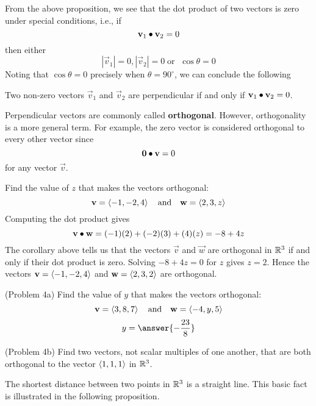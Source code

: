 \documentclass[handout]{ximera}
\begin{document}
From the above proposition, we see that the dot product of two vectors is zero under special conditions, i.e.,  if 
\[
\mathbf{v}_1 \bullet \mathbf{v}_2 = 0
\]
then either
\[
|\vec{v}_1| = 0, |\vec{v}_2| = 0 \; \text{or } \; \cos \theta = 0
\]
Noting that $\cos \theta = 0$ precisely when $\theta = 90^\circ$, we can conclude the following

\begin{corollary} 
Two non-zero vectors $\vec{v}_1$ and $\vec{v}_2$ are perpendicular if and only if $\mathbf{v}_1 \bullet \mathbf{v}_2 = 0$.
\end{corollary}

Perpendicular vectors are commonly called \textbf{orthogonal}. However, orthogonality is a more general term. 
For example, the zero vector is considered orthogonal to every other vector since
\[
\mathbf 0 \bullet \mathbf v = 0
\]
for any vector $\vec v$.

\begin{example}[Example 4]
Find the value of $z$ that makes the vectors orthogonal:
\[
\mathbf v = \left\langle -1,-2, 4\right\rangle \quad \text{and} \quad \mathbf w = \left\langle 2,3, z\right\rangle
\]
Computing the dot product gives
\[
\mathbf v \bullet \mathbf w = (-1)(2) + (-2)(3) + (4)(z) = -8+4z
\]
The corollary above tells us that the vectors $\vec v$ and $\vec w$ are orthogonal in $\mathbb R^3$ if and only if their 
dot product is zero. Solving $-8 + 4z = 0$ for $z$
gives $z = 2$. Hence the vectors $\mathbf v = \left\langle -1,-2, 4\right\rangle$ and $\mathbf w = \left\langle 2,3, 2\right\rangle$ are orthogonal.
\end{example}

\begin{problem}(Problem 4a) 
Find the value of $y$ that makes the vectors orthogonal:
\[
\mathbf v = \left\langle 3,8, 7\right\rangle \quad \text{and} \quad \mathbf w = \left\langle -4,y, 5\right\rangle
\]
\[
y = \answer{-\frac{23}{8}}
\]
\end{problem}

\begin{problem}(Problem 4b) Find two vectors, not scalar multiples of one another, that are both orthogonal to the 
vector $\left\langle 1,1,1\right\rangle$ in $\mathbb R^3$.
\end{problem}


The shortest distance between two points in $\mathbb R^3$ is a straight line.  This basic fact is illustrated in the following proposition.
\end{document}
